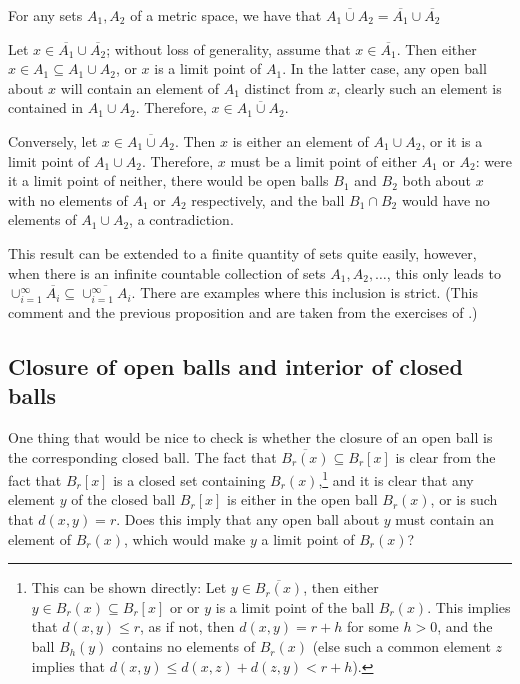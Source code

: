 \begin{bprop}{}{}
For any sets $A_{1},A_{2}$ of a metric space, we have that \mbox{$\overline{A_{1} \cup A_{2}} = \overline{A_{1}} \cup \overline{A_{2}}$}
\end{bprop}
\begin{bproof}{}{}
Let $x\in \overline{A_{1}} \cup \overline{A_{2}}$; without loss of generality, assume that $x\in \overline{A_{1}}$. Then either \mbox{$x\in A_{1} \subseteq A_{1}\cup A_{2}$}, or $x$ is a limit point of $A_{1}$. In the latter case, any open ball about $x$ will contain an element of $A_{1}$ distinct from $x$, clearly such an element is contained in $A_{1}\cup A_{2}$. Therefore, $x\in \overline{A_{1} \cup A_{2}}$.

Conversely, let $x\in \overline{A_{1} \cup A_{2}}$. Then $x$ is either an element of ${A_{1} \cup A_{2}}$, or it is a limit point of $A_{1} \cup A_{2}$. Therefore, $x$ must be a limit point of either $A_{1}$ or $A_{2}$: were it a limit point of neither, there would be open balls $B_{1}$ and $B_{2}$ both about $x$ with no elements of $A_{1}$ or $A_{2}$ respectively, and the ball $B_{1} \cap B_{2}$ would have no elements of $A_{1} \cup A_{2}$, a contradiction.
\eop
\end{bproof}
This result can be extended to a finite quantity of sets quite easily, however, when there is an infinite countable collection of sets $A_{1}, A_{2}, \ldots$, this only leads to $\cup_{i=1}^{\infty} \overline{A_{i}} \subseteq \overline{\cup_{i=1}^{\infty} A_{i}}$. There are examples where this inclusion is strict. (This comment and the previous proposition and are taken from the exercises of \cite{rudin}.)

\subsection{Closure of open balls and interior of closed balls}
One thing that would be nice to check is whether the closure of an open ball is the corresponding closed ball. The fact that $\overline{B_{r}(x)} \subseteq B_{r}[x]$ is clear from the fact that $B_{r}[x]$ is a closed set containing $B_{r}(x)$,\footnote{This can be shown directly: Let $y\in \overline{B_{r}(x)}$, then either $y\in B_{r}(x) \subseteq B_{r}[x]$ or or $y$ is a limit point of the ball $B_{r}(x)$. This implies that $d(x,y) \leq r$, as if not, then $d(x,y) = r + h$ for some $h>0$, and the ball $B_{h}(y)$ contains no elements of $B_{r}(x)$ (else such a common element $z$ implies that \mbox{$d(x,y)\leq d(x,z) + d(z,y) < r + h$).}} and it is clear that any element $y$ of the closed ball $B_{r}[x]$ is either in the open ball $B_{r}(x)$, or is such that $d(x,y) = r$. Does this imply that any open ball about $y$ must contain an element of $B_{r}(x)$, which would make $y$ a limit point of $B_{r}(x)$?

